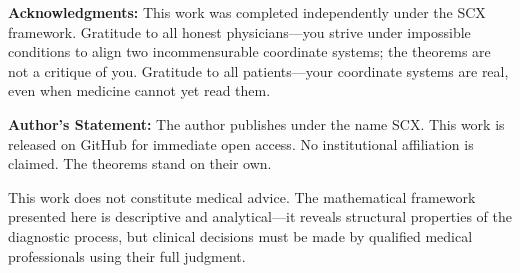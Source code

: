 \documentclass[12pt,a4paper]{article}
\theoremstyle{remark}
\begin{document}
\vspace{10pt}
\noindent\textbf{Acknowledgments:} This work was completed independently under the SCX framework. Gratitude to all honest physicians---you strive under impossible conditions to align two incommensurable coordinate systems; the theorems are not a critique of you. Gratitude to all patients---your coordinate systems are real, even when medicine cannot yet read them.

\vspace{10pt}
\noindent\textbf{Author's Statement:} The author publishes under the name SCX. This work is released on GitHub for immediate open access. No institutional affiliation is claimed. The theorems stand on their own. 

This work does not constitute medical advice. The mathematical framework presented here is descriptive and analytical---it reveals structural properties of the diagnostic process, but clinical decisions must be made by qualified medical professionals using their full judgment.
\end{document}
